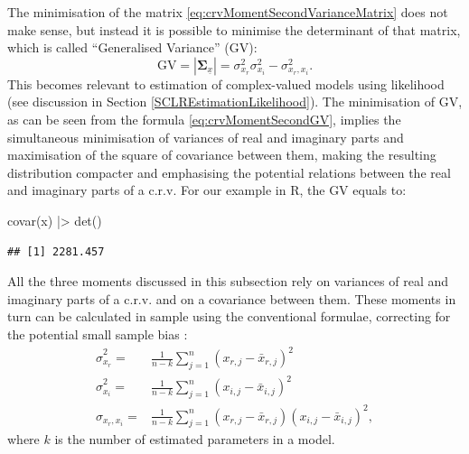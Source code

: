 \documentclass[
]{book}
\newenvironment{Shaded}{\begin{snugshade}}{\end{snugshade}}
\newcommand{\FunctionTok}[1]{\textcolor[rgb]{0.00,0.00,0.00}{#1}}
\newcommand{\NormalTok}[1]{#1}
\newcommand{\SpecialCharTok}[1]{\textcolor[rgb]{0.00,0.00,0.00}{#1}}
\begin{document}
The minimisation of the matrix \eqref{eq:crvMomentSecondVarianceMatrix} does not make sense, but instead it is possible to minimise the determinant of that matrix, which is called ``Generalised Variance'' (GV):
\begin{equation}
    \mathrm{GV} = |\boldsymbol{\Sigma}_{\underline{x}}| = \sigma_{x_r}^2 \sigma_{x_i}^2 - \sigma_{x_r, x_i}^2 .
    \label{eq:crvMomentSecondGV}
\end{equation}
This becomes relevant to estimation of complex-valued models using likelihood (see discussion in Section \ref{SCLREstimationLikelihood}). The minimisation of GV, as can be seen from the formula \eqref{eq:crvMomentSecondGV}, implies the simultaneous minimisation of variances of real and imaginary parts and maximisation of the square of covariance between them, making the resulting distribution compacter and emphasising the potential relations between the real and imaginary parts of a c.r.v. For our example in R, the GV equals to:

\begin{Shaded}
\begin{Highlighting}[]
\FunctionTok{covar}\NormalTok{(x) }\SpecialCharTok{|\textgreater{}} \FunctionTok{det}\NormalTok{()}
\end{Highlighting}
\end{Shaded}

\begin{verbatim}
## [1] 2281.457
\end{verbatim}

All the three moments discussed in this subsection rely on variances of real and imaginary parts of a c.r.v. and on a covariance between them. These moments in turn can be calculated in sample using the conventional formulae, correcting for the potential small sample bias \citep{SvetunkovSBA}:
\begin{equation}
    \begin{aligned}
        \hat{\sigma}_{x_r}^2 = & \frac{1}{n-k} \sum_{j=1}^n (x_{r,j}-\bar{x}_{r,j})^2 \\
        \hat{\sigma}_{x_i}^2 = & \frac{1}{n-k} \sum_{j=1}^n (x_{i,j}-\bar{x}_{i,j})^2 \\
        \hat{\sigma}_{x_r, x_i} = & \frac{1}{n-k} \sum_{j=1}^n (x_{r,j}-\bar{x}_{r,j})(x_{i,j}-\bar{x}_{i,j})^2 ,
    \end{aligned}
    \label{eq:crvMomentSecondSample}
\end{equation}
where \(k\) is the number of estimated parameters in a model.
\end{document}
